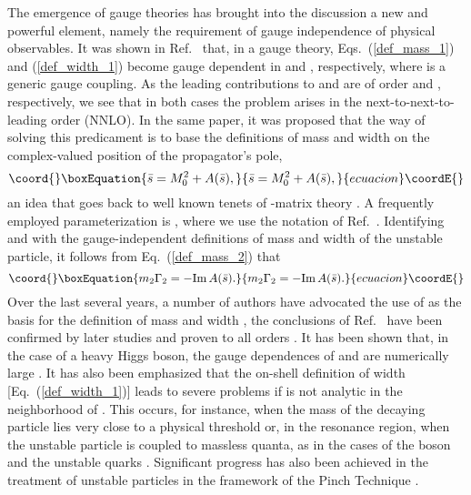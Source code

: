 \documentclass[a4paper,12pt]{article}
\begin{document}
The emergence of gauge theories has brought into the discussion a new and
powerful element, namely the requirement of gauge independence of physical
observables.
It was shown in Ref.~\cite{si_1} that, in a gauge theory,
Eqs.~(\ref{def_mass_1}) and (\ref{def_width_1}) become gauge dependent in
\coordHE{} and \coordHE{}, respectively, where \coordHE{} is a generic gauge coupling.
As the leading contributions to \coordHE{} and \myHighlight{$\Gamma$}\coordHE{} are of order \coordHE{} and
\coordHE{}, respectively, we see that in both cases the problem arises in the
next-to-next-to-leading order (NNLO).
In the same paper, it was proposed that the way of solving this predicament is
to base the definitions of mass and width on the complex-valued position of
the propagator's pole,
\begin{equation}\coord{}\boxEquation{
\label{def_mass_2}
\bar s=M^2_0+A(\bar s), 
}{
\bar s=M^2_0+A(\bar s), 
}{ecuacion}\coordE{}\end{equation}
an idea that goes back to well known tenets of \coordHE{}-matrix theory
\cite{s-matrix}.
A frequently employed parameterization is \coordHE{}, where
we use the notation of Ref.~\cite{si_1}.
Identifying \coordHE{} and \coordHE{} with the gauge-independent definitions of
mass and width of the unstable particle, it follows from
Eq.~(\ref{def_mass_2}) that
\begin{equation}\coord{}\boxEquation{
\label{def_width_2}
m_2\Gamma_2=-{\rm Im}\,A(\bar s).  
}{
m_2\Gamma_2=-{\rm Im}\,A(\bar s).  
}{ecuacion}\coordE{}\end{equation}
Over the last several years, a number of authors have advocated the use of
\coordHE{} as the basis for the definition of mass and width \cite{zmass}, the
conclusions of Ref.~\cite{si_1} have been confirmed by later studies
\cite{psz,si-kniehl} and proven to all orders \cite{gg}.
It has been shown that, in the case of a heavy Higgs boson, the gauge
dependences of \coordHE{} and \myHighlight{$\Gamma$}\coordHE{} are numerically large \cite{si-kniehl}.
It has also been emphasized that the on-shell definition of width
[Eq.~(\ref{def_width_1})] leads to severe problems if \coordHE{} is not analytic
in the neighborhood of \coordHE{}.
This occurs, for instance, when the mass of the decaying particle lies very
close to a physical threshold \cite{bhatta,pal} or, in the resonance region,
when the unstable particle is coupled to massless quanta, as in the cases of
the \coordHE{} boson and the unstable quarks \cite{psw}.
Significant progress has also been achieved in the treatment of unstable
particles in the framework of the Pinch Technique \cite{pt}.
\end{document}
